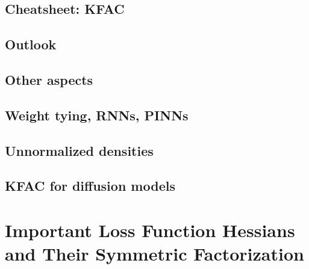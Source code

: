 \documentclass{article}
\begin{document}
\clearpage

\begin{paracol}{1}
  \section{Cheatsheet: KFAC}
  
  \end{paracol}
\clearpage


\begin{paracol}{1}
  \section{Outlook}
  

\end{paracol}

\clearpage

\begin{paracol}{2}
  \section{Other aspects}
  \subsection{Weight tying, RNNs, PINNs}
  \subsection{Unnormalized densities}
  \subsection{KFAC for diffusion models}
\end{paracol}

\clearpage


\appendix

\section{Important Loss Function Hessians and Their Symmetric Factorization}\label{app:loss_function_hessians}

\end{document}
